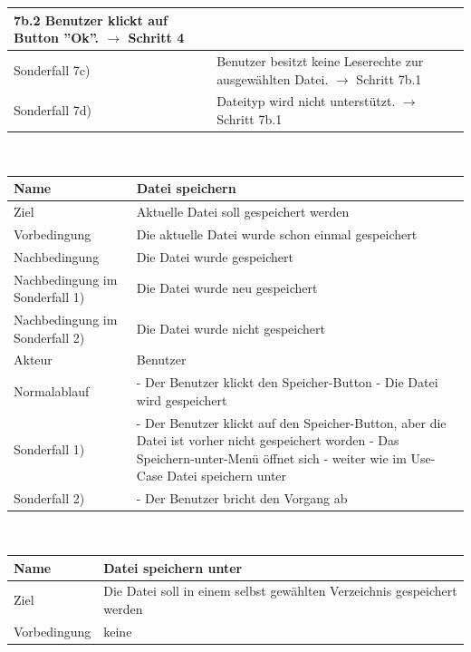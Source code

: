 \documentclass[a4paper,12pt]{scrartcl}
\begin{document}
\begin{center}
\begin{tabular}{|p{5cm}|p{10cm}|}
 7b.2 Benutzer klickt auf Button ''Ok''.
\newline
$ \rightarrow$ Schritt 4
\\
\hline Sonderfall 7c)& Benutzer besitzt keine Leserechte zur ausgewählten Datei.
\newline
$ \rightarrow$ Schritt 7b.1 
\\
\hline Sonderfall 7d)& Dateityp wird nicht unterstützt.
\newline
$ \rightarrow$ Schritt 7b.1 
\\
\hline 
\end{tabular} 
\vspace{0.7cm}
\\
\begin{tabular}{|p{5cm}|p{10cm}|}
\hline Name & \textbf{Datei speichern} \\ 
\hline Ziel & Aktuelle Datei soll gespeichert werden \\ 
\hline Vorbedingung & Die aktuelle Datei wurde schon einmal gespeichert \\ 
\hline Nachbedingung & Die Datei wurde gespeichert \\ 
\hline Nachbedingung im Sonderfall 1) & Die Datei wurde neu gespeichert \\ 
\hline Nachbedingung im Sonderfall 2) & Die Datei wurde nicht gespeichert\\
\hline Akteur & Benutzer \\ 
\hline Normalablauf & - Der Benutzer klickt den Speicher-Button 
\newline
- Die Datei wird gespeichert
\\
\hline Sonderfall 1) & - Der Benutzer klickt auf den Speicher-Button, aber die Datei ist vorher nicht gespeichert worden
\newline
- Das Speichern-unter-Menü öffnet sich
\newline
- weiter wie im Use-Case Datei speichern unter
 \\ 
 \hline Sonderfall 2) & - Der Benutzer bricht den Vorgang ab \\
\hline 
\end{tabular}
\vspace{0.7cm}
\\
\begin{tabular}{|p{5cm}|p{10cm}|}
\hline Name & \textbf{Datei speichern unter} \\ 
\hline Ziel & Die Datei soll in einem selbst gewählten Verzeichnis gespeichert werden \\ 
\hline Vorbedingung & keine \\ 

\end{tabular}
\end{center}
\end{document}

